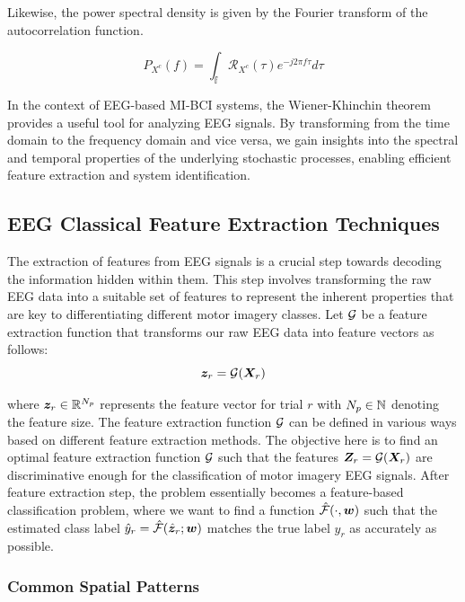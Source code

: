Likewise, the power spectral density is given by the Fourier transform of the autocorrelation function.

\begin{equation}
    P_{X^c}(f) = \int_{\mathbb{f}} \mathcal{R}_{X^c}(\tau) e^{-j 2\pi f \tau} d\tau
\end{equation}

In the context of EEG-based MI-BCI systems, the Wiener-Khinchin theorem provides a useful tool for analyzing EEG signals. By transforming from the time domain to the frequency domain and vice versa, we gain insights into the spectral and temporal properties of the underlying stochastic processes, enabling efficient feature extraction and system identification.


\subsection{EEG Classical Feature Extraction Techniques}

The extraction of features from EEG signals is a crucial step towards decoding the information hidden within them. This step involves transforming the raw EEG data into a suitable set of features to represent the inherent properties that are key to differentiating different motor imagery classes. Let $\mathcal {G}$ be a feature extraction function that transforms our raw EEG data into feature vectors as follows:
\begin{equation}
\bm {z}_r = \mathcal {G}(\bm {X}_r)    
\end{equation}

where $\bm {z}_r \in \mathbb{R}^{N_p}$ represents the feature vector for trial $r$ with $N_p \in \mathbb{N}$ denoting the feature size. The feature extraction function $\mathcal {G}$ can be defined in various ways based on different feature extraction methods. The objective here is to find an optimal feature extraction function $\mathcal {G}$ such that the features $\bm {Z}_r = \mathcal {G}(\bm {X}_r)$ are discriminative enough for the classification of motor imagery EEG signals. After feature extraction step, the problem essentially becomes a feature-based classification problem, where we want to find a function $\hat{\mathcal {F}}(\cdot,\bm {w})$ such that the estimated class label $\hat{y}_r = \hat{\mathcal {F}}(\hat{\bm {z}}_r; \bm {w})$ matches the true label $y_r$ as accurately as possible.

\subsubsection{Common Spatial Patterns}

